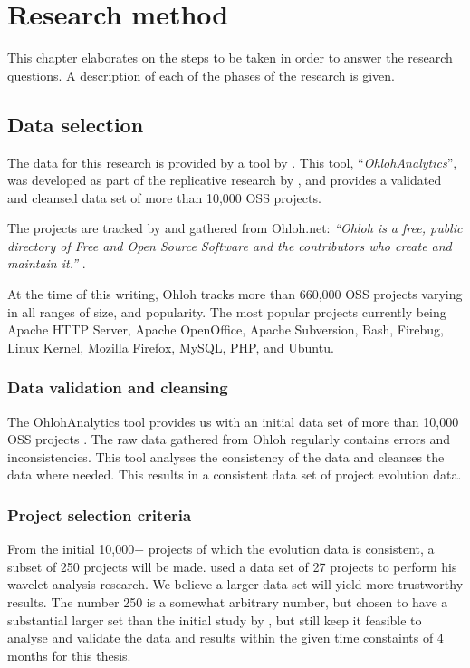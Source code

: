 \chapter{Research method}
\label{method}

This chapter elaborates on the steps to be taken in order to answer the
research questions. A description of each of the phases of the research is
given.

\section{Data selection}
\label{method:data}

The data for this research is provided by a tool by \citet{ohlohanalytics}.
This tool, ``\emph{OhlohAnalytics}\rm'', was developed as part of the
replicative research by \citet{bruntink2014}, and provides a validated and
cleansed data set of more than 10,000 OSS projects.

The projects are tracked by and gathered from Ohloh.net: \emph{``Ohloh is a
free, public directory of Free and Open Source Software and the contributors
who create and maintain it.'' }\rm \cite{ohloh}.

At the time of this writing, Ohloh tracks more than 660,000 OSS projects varying
in all ranges of size, and popularity. The most popular projects currently being
Apache HTTP Server, Apache OpenOffice, Apache Subversion, Bash, Firebug, Linux
Kernel, Mozilla Firefox, MySQL, PHP, and Ubuntu.

\subsection{Data validation and cleansing}
The OhlohAnalytics tool provides us with an initial data set of more than
10,000 OSS projects \cite{bruntink2014}. The raw data gathered from Ohloh
regularly contains errors and inconsistencies. This tool analyses the
consistency of the data and cleanses the data where needed. This results in a
consistent data set of project evolution data.



\subsection{Project selection criteria}

From the initial 10,000+ projects of which the evolution data is consistent, a
subset of 250 projects will be made. \citet{karus2013} used a data set of 27
projects to perform his wavelet analysis research. We believe a larger
data set will yield more trustworthy results. The number 250 is a somewhat
arbitrary number, but chosen to have a substantial larger set than the initial
study by \citeauthor{karus2013}, but still keep it feasible to analyse and
validate the data and results within the given time constaints of 4 months for
this thesis.

